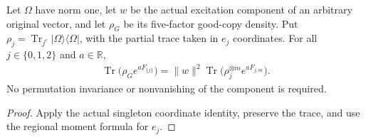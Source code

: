 \begin{theorem}
\label{thm:replica_good_configuration_singleton_moment}
Let $\Omega$ have norm one, let $w$ be the actual excitation component
of an arbitrary original vector, and let $\rho_G$ be its five-factor
good-copy density. Put
$\rho_j=\operatorname{Tr}_{j^c}|\Omega\rangle\langle\Omega|$,
with the partial trace taken in $e_j$ coordinates. For all
$j\in\{0,1,2\}$ and $a\in\mathbb R$,
\begin{align*}
 \operatorname{Tr}\bigl(\rho_G e^{aF_{\{j\}}}\bigr)
 =\|w\|^2\operatorname{Tr}\bigl(\rho_j^{\otimes m}e^{aF_{j,m}}\bigr).
\end{align*}
No permutation invariance or nonvanishing of the component is required.
\end{theorem}
\begin{proof}
Apply the actual singleton coordinate identity, preserve the trace,
and use the regional moment formula for $e_j$.
\end{proof}
